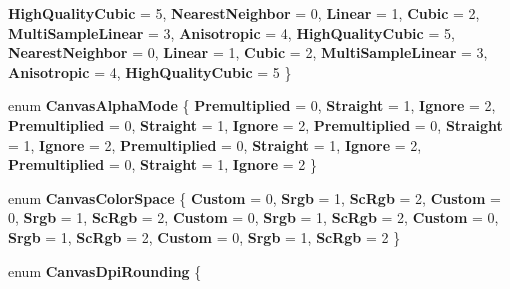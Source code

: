 \begin{DoxyCompactItemize}
{\bfseries High\+Quality\+Cubic} = 5, 
{\bfseries Nearest\+Neighbor} = 0, 
{\bfseries Linear} = 1, 
\newline
{\bfseries Cubic} = 2, 
{\bfseries Multi\+Sample\+Linear} = 3, 
{\bfseries Anisotropic} = 4, 
{\bfseries High\+Quality\+Cubic} = 5, 
\newline
{\bfseries Nearest\+Neighbor} = 0, 
{\bfseries Linear} = 1, 
{\bfseries Cubic} = 2, 
{\bfseries Multi\+Sample\+Linear} = 3, 
\newline
{\bfseries Anisotropic} = 4, 
{\bfseries High\+Quality\+Cubic} = 5
 \}
\item 
\mbox{\label{namespace_microsoft_1_1_graphics_1_1_canvas_a1ab747c729197befb5d2c28b22e08bc3}} 
enum {\bfseries Canvas\+Alpha\+Mode} \{ \newline
{\bfseries Premultiplied} = 0, 
{\bfseries Straight} = 1, 
{\bfseries Ignore} = 2, 
{\bfseries Premultiplied} = 0, 
\newline
{\bfseries Straight} = 1, 
{\bfseries Ignore} = 2, 
{\bfseries Premultiplied} = 0, 
{\bfseries Straight} = 1, 
\newline
{\bfseries Ignore} = 2, 
{\bfseries Premultiplied} = 0, 
{\bfseries Straight} = 1, 
{\bfseries Ignore} = 2, 
\newline
{\bfseries Premultiplied} = 0, 
{\bfseries Straight} = 1, 
{\bfseries Ignore} = 2
 \}
\item 
\mbox{\label{namespace_microsoft_1_1_graphics_1_1_canvas_a968dbdb8c3779105d9af1ee42d19efa5}} 
enum {\bfseries Canvas\+Color\+Space} \{ \newline
{\bfseries Custom} = 0, 
{\bfseries Srgb} = 1, 
{\bfseries Sc\+Rgb} = 2, 
{\bfseries Custom} = 0, 
\newline
{\bfseries Srgb} = 1, 
{\bfseries Sc\+Rgb} = 2, 
{\bfseries Custom} = 0, 
{\bfseries Srgb} = 1, 
\newline
{\bfseries Sc\+Rgb} = 2, 
{\bfseries Custom} = 0, 
{\bfseries Srgb} = 1, 
{\bfseries Sc\+Rgb} = 2, 
\newline
{\bfseries Custom} = 0, 
{\bfseries Srgb} = 1, 
{\bfseries Sc\+Rgb} = 2
 \}
\item 
\mbox{\label{namespace_microsoft_1_1_graphics_1_1_canvas_aaf9bdf2614ae3a2c3978ef7522070d82}} 
enum {\bfseries Canvas\+Dpi\+Rounding} \{ \newline

\end{DoxyCompactItemize}
